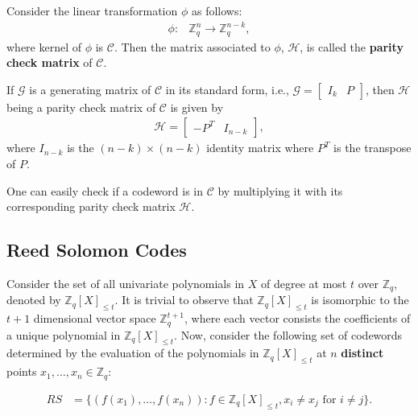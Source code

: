 \begin{definition}
  Consider the linear transformation $\phi$ as follows:
  \begin{align*}
    \phi:& \mathbb{Z}_q^n \rightarrow \mathbb{Z}_q^{n-k},
  \end{align*}
  where kernel of $\phi$ is $\mathcal{C}$. Then the matrix associated to $\phi$, $\mathcal{H}$, 
  is called the \textbf{parity check matrix} of $\mathcal{C}$.
\end{definition}

\begin{lemma}\cite{../gallian2024contemporary}
  If $\mathcal{G}$ is a generating matrix of $\mathcal{C}$ in its standard form, i.e., $\mathcal{G} = \begin{bmatrix}
    I_k & P
  \end{bmatrix}$, then $\mathcal{H}$ being a parity check matrix of $\mathcal{C}$ is given by
  \begin{align*}
    \mathcal{H} = \begin{bmatrix}
      -P^T & I_{n-k}
    \end{bmatrix},
  \end{align*}
  where $I_{n-k}$ is the $(n-k)\times (n-k)$ identity matrix where $P^T$ is the transpose of $P$.
\end{lemma}

One can easily check if a codeword is in $\mathcal{C}$ by multiplying it with its corresponding parity 
check matrix $\mathcal{H}$.

\subsection{Reed Solomon Codes}
\label{subsec:reed-solomon}
Consider the set of all univariate polynomials in $X$ of degree at most $t$ over $\mathbb{Z}_q$, denoted by 
$\mathbb{Z}_q[X]_{\leq t}$. It is trivial to observe that $\mathbb{Z}_q[X]_{\leq t}$ is isomorphic to 
the $t+1$ dimensional vector space $\mathbb{Z}_q^{t+1}$, where each vector consists the coefficients of 
a unique polynomial in $\mathbb{Z}_q[X]_{\leq t}$. Now, consider the following set of codewords 
determined by the evaluation of the polynomials in $\mathbb{Z}_q[X]_{\leq t}$ at $n$ \textbf{distinct} 
points $x_1,\dots,x_n\in \mathbb{Z}_q$:

\begin{align}\label{eq:reed-solomon code}
  RS &= \{(f(x_1),\dots,f(x_n)) : f\in \mathbb{Z}_q[X]_{\leq t}, x_i\neq x_j \text{ for }i\neq j\}.
\end{align}  

